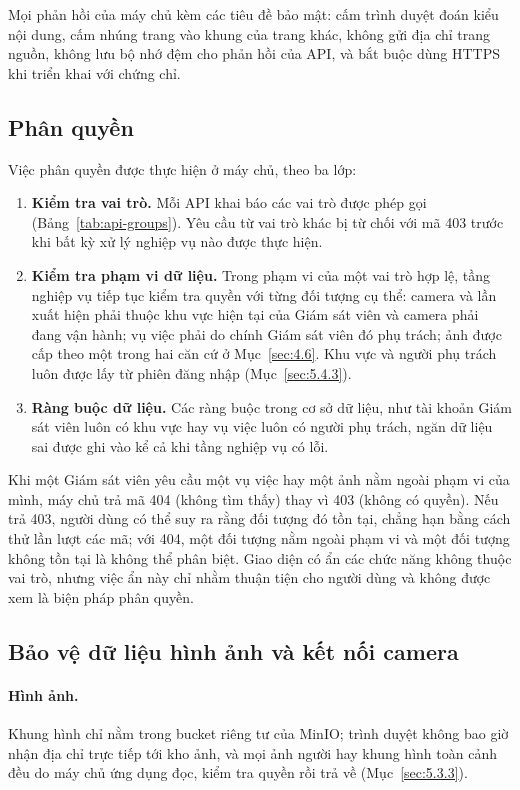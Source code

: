 Mọi phản hồi của máy chủ kèm các tiêu đề bảo mật: cấm trình duyệt đoán kiểu nội dung, cấm nhúng trang vào khung của trang khác, không gửi địa chỉ trang nguồn, không lưu bộ nhớ đệm cho phản hồi của API, và bắt buộc dùng HTTPS khi triển khai với chứng chỉ.

\subsection{Phân quyền}
\label{sec:5.5.3}

Việc phân quyền được thực hiện ở máy chủ, theo ba lớp:
\begin{enumerate}
    \item \textbf{Kiểm tra vai trò.} Mỗi API khai báo các vai trò được phép gọi (Bảng~\ref{tab:api-groups}). Yêu cầu từ vai trò khác bị từ chối với mã 403 trước khi bất kỳ xử lý nghiệp vụ nào được thực hiện.
    \item \textbf{Kiểm tra phạm vi dữ liệu.} Trong phạm vi của một vai trò hợp lệ, tầng nghiệp vụ tiếp tục kiểm tra quyền với từng đối tượng cụ thể: camera và lần xuất hiện phải thuộc khu vực hiện tại của Giám sát viên và camera phải đang vận hành; vụ việc phải do chính Giám sát viên đó phụ trách; ảnh được cấp theo một trong hai căn cứ ở Mục~\ref{sec:4.6}. Khu vực và người phụ trách luôn được lấy từ phiên đăng nhập (Mục~\ref{sec:5.4.3}).
    \item \textbf{Ràng buộc dữ liệu.} Các ràng buộc trong cơ sở dữ liệu, như tài khoản Giám sát viên luôn có khu vực hay vụ việc luôn có người phụ trách, ngăn dữ liệu sai được ghi vào kể cả khi tầng nghiệp vụ có lỗi.
\end{enumerate}

Khi một Giám sát viên yêu cầu một vụ việc hay một ảnh nằm ngoài phạm vi của mình, máy chủ trả mã 404 (không tìm thấy) thay vì 403 (không có quyền). Nếu trả 403, người dùng có thể suy ra rằng đối tượng đó tồn tại, chẳng hạn bằng cách thử lần lượt các mã; với 404, một đối tượng nằm ngoài phạm vi và một đối tượng không tồn tại là không thể phân biệt. Giao diện có ẩn các chức năng không thuộc vai trò, nhưng việc ẩn này chỉ nhằm thuận tiện cho người dùng và không được xem là biện pháp phân quyền.

\subsection{Bảo vệ dữ liệu hình ảnh và kết nối camera}
\label{sec:5.5.4}

\paragraph{Hình ảnh.} Khung hình chỉ nằm trong bucket riêng tư của MinIO; trình duyệt không bao giờ nhận địa chỉ trực tiếp tới kho ảnh, và mọi ảnh người hay khung hình toàn cảnh đều do máy chủ ứng dụng đọc, kiểm tra quyền rồi trả về (Mục~\ref{sec:5.3.3}).

